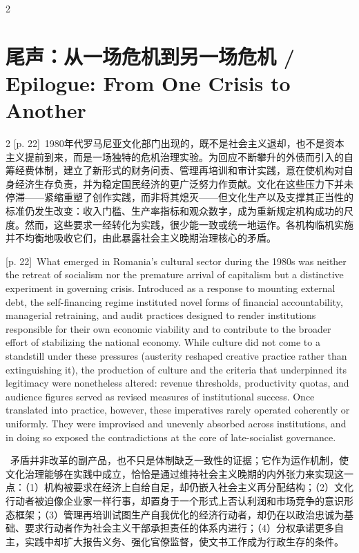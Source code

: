 \documentclass[10pt,a4paper]{article}
\begin{document}
\begin{paracol}{2}
\switchcolumn*
\end{paracol}
\section*{尾声：从一场危机到另一场危机 / Epilogue: From One Crisis to Another}
\begin{paracol}{2}
{\scriptsize\color{gray} [p. 22]}\ 1980年代罗马尼亚文化部门出现的，既不是社会主义退却，也不是资本主义提前到来，而是一场独特的危机治理实验。为回应不断攀升的外债而引入的自筹经费体制，建立了新形式的财务问责、管理再培训和审计实践，意在使机构对自身经济生存负责，并为稳定国民经济的更广泛努力作贡献。文化在这些压力下并未停滞——紧缩重塑了创作实践，而非将其熄灭——但文化生产以及支撑其正当性的标准仍发生改变：收入门槛、生产率指标和观众数字，成为重新规定机构成功的尺度。然而，这些要求一经转化为实践，很少能一致或统一地运作。各机构临机实施并不均衡地吸收它们，由此暴露社会主义晚期治理核心的矛盾。\par
\switchcolumn
{\scriptsize\color{gray} [p. 22]}\ What emerged in Romania’s cultural sector during the 1980s was neither the retreat of socialism nor the premature arrival of capitalism but a distinctive experiment in governing crisis. Introduced as a response to mounting external debt, the self-financing regime instituted novel forms of financial accountability, managerial retraining, and audit practices designed to render institutions responsible for their own economic viability and to contribute to the broader effort of stabilizing the national economy. While culture did not come to a standstill under these pressures (austerity reshaped creative practice rather than extinguishing it), the production of culture and the criteria that underpinned its legitimacy were nonetheless altered: revenue thresholds, productivity quotas, and audience figures served as revised measures of institutional success. Once translated into practice, however, these imperatives rarely operated coherently or uniformly. They were improvised and unevenly absorbed across institutions, and in doing so exposed the contradictions at the core of late-socialist governance.\par
\switchcolumn*
{\scriptsize\color{gray} [p. 23]}\ 矛盾并非改革的副产品，也不只是体制缺乏一致性的证据；它作为运作机制，使文化治理能够在实践中成立，恰恰是通过维持社会主义晚期的内外张力来实现这一点：（1）机构被要求在经济上自给自足，却仍嵌入社会主义再分配结构；（2）文化行动者被迫像企业家一样行事，却置身于一个形式上否认利润和市场竞争的意识形态框架；（3）管理再培训试图生产自我优化的经济行动者，却仍在以政治忠诚为基础、要求行动者作为社会主义干部承担责任的体系内进行；（4）分权承诺更多自主，实践中却扩大报告义务、强化官僚监督，使文书工作成为行政生存的条件。\par

\end{paracol}
\end{document}
